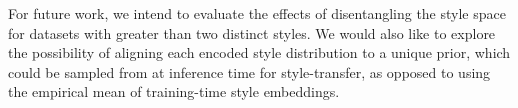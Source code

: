 \documentclass[letterpaper]{article} %
\newcommand{\loss}[2]{J_{\text{#1}}^{\text{#2}}}
\begin{document}
For future work, we intend to evaluate the effects of disentangling the style space for datasets with greater than two distinct styles.
We would also like to explore the possibility of aligning each encoded style distribution to a unique prior, which could be sampled from at inference time for style-transfer, as opposed to using the empirical mean of training-time style embeddings.











\end{document}
